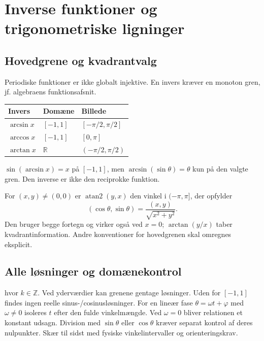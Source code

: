 \section{Inverse funktioner og trigonometriske ligninger}
\subsection{Hovedgrene og kvadrantvalg}
Periodiske funktioner er ikke globalt injektive. En invers kræver en
monoton gren, jf. algebraens funktionsafsnit.
\begin{center}
\begin{tabular}{@{}lll@{}}
\toprule
Invers & Domæne & Billede\\\midrule
$\arcsin x$ & $[-1,1]$ & $[-\pi/2,\pi/2]$\\
$\arccos x$ & $[-1,1]$ & $[0,\pi]$\\
$\arctan x$ & $\mathbb R$ & $(-\pi/2,\pi/2)$\\\bottomrule
\end{tabular}
\end{center}
$\sin(\arcsin x)=x$ på $[-1,1]$, men
$\arcsin(\sin\theta)=\theta$ kun på den valgte gren.
Den inverse er ikke den reciprokke funktion.



For $(x,y)\ne(0,0)$ er $\operatorname{atan2}(y,x)$ den vinkel i
$(-\pi,\pi]$, der opfylder
\[
(\cos\theta,\sin\theta)=\frac{(x,y)}{\sqrt{x^2+y^2}}.
\]
Den bruger begge fortegn og virker også ved $x=0$;
$\arctan(y/x)$ taber kvadrantinformation. Andre konventioner for
hovedgrenen skal omregnes eksplicit.

\subsection{Alle løsninger og domænekontrol}
hvor $k\in\mathbb Z$. Ved yderværdier kan grenene gentage løsninger.
Uden for $[-1,1]$ findes ingen reelle sinus-/cosinusløsninger.
For en lineær fase $\theta=\omega t+\varphi$ med $\omega\ne0$ isoleres
$t$ efter den fulde vinkelmængde. Ved $\omega=0$ bliver relationen et
konstant udsagn. Division med $\sin\theta$ eller $\cos\theta$ kræver
separat kontrol af deres nulpunkter. Skær til sidst med fysiske
vinkelintervaller og orienteringskrav.

